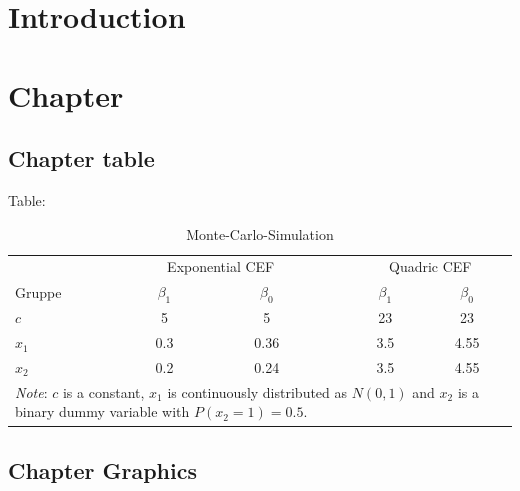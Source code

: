 \documentclass[12pt,a4paper]{article}
\begin{document}
\tableofcontents
\newpage


\section{Introduction}

\blindtext

\newpage




\section{Chapter}

\blindtext

\subsection{Chapter table}

Table:
\begin{table}[ht]
\centering
\caption{Monte-Carlo-Simulation}
\label{mc-param}
\begin{tabular}{lccccc}\toprule
 &  \multicolumn{2}{c}{Exponential CEF} & & \multicolumn{2}{c}{Quadric CEF} \\
Gruppe  & $\beta_1$ & $\beta_0$ &  & $\beta_1$ & $\beta_0$ \\ \cmidrule{2-3} \cmidrule{5-6}
$c$      & 5    & 5     & & 23  & 23 \\
$x_1$   & 0.3   & 0.36  & & 3.5 & 4.55 \\
$x_2$   & 0.2   & 0.24  & & 3.5 & 4.55 \\ \bottomrule
\multicolumn{6}{p{9cm}}{\footnotesize\textit{Note}: $c$ is a constant,  $x_1$ is continuously distributed as
$N(0,1)$ and $x_2$ is a binary dummy variable with $P(x_2=1)=0.5$. }
\end{tabular}
\end{table}

\newpage
\subsection{Chapter Graphics}
\end{document}
